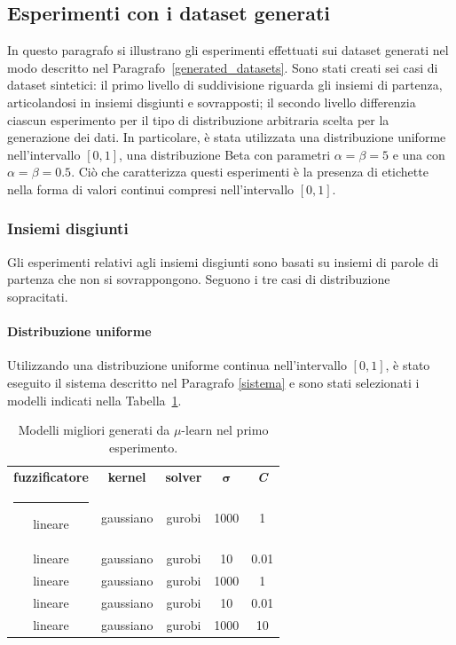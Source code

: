 \documentclass[12pt]{report}
\makeatletter
\theoremstyle{definition}
\newcommand{\thickhline}{%
    \noalign {\ifnum 0=`}\fi \hrule height 1pt
    \futurelet \reserved@a \@xhline
}
\makeatother
\begin{document}
\subsection{Esperimenti con i dataset generati}
In questo paragrafo si illustrano gli esperimenti effettuati sui dataset generati nel modo descritto nel Paragrafo~\ref{generated_datasets}. Sono stati creati sei casi di dataset sintetici: il primo livello di suddivisione riguarda gli insiemi di partenza, articolandosi in insiemi disgiunti e sovrapposti; il secondo livello differenzia ciascun esperimento per il tipo di distribuzione arbitraria scelta per la generazione dei dati. In particolare, è stata utilizzata una distribuzione uniforme nell'intervallo $[0,1]$, una distribuzione Beta con parametri $\alpha = \beta = 5$ e una con $\alpha = \beta = 0.5$. Ciò che caratterizza questi esperimenti è la presenza di etichette nella forma di valori continui compresi nell'intervallo $[0,1]$.

\subsubsection{Insiemi disgiunti}\label{insiemidisgiunti}
Gli esperimenti relativi agli insiemi disgiunti sono basati su insiemi di parole di partenza che non si sovrappongono. Seguono i tre casi di distribuzione sopracitati.

\paragraph{Distribuzione uniforme} Utilizzando una distribuzione uniforme continua nell'intervallo $[0,1]$, è stato eseguito il sistema descritto nel Paragrafo \ref{sistema} e sono stati selezionati i modelli indicati nella Tabella~\ref{models_exp1}.
\begin{table}
\centering
\begin{adjustbox}{max width=\textwidth}
 \begin{tabular}{|c|c|c|c|c|} 
 \hline
\textbf{fuzzificatore} & \textbf{kernel} & \textbf{solver} & $\bm{\sigma}$ & \textit{\textbf{C}}
\\ [0.5ex] 
 \thickhline
 lineare & gaussiano & gurobi & 1000 & 1 \\
 lineare & gaussiano & gurobi & 10 & 0.01 \\
 lineare & gaussiano & gurobi & 1000 & 1 \\
 lineare & gaussiano & gurobi & 10 & 0.01 \\
 lineare & gaussiano & gurobi & 1000 & 10 \\
 \hline
\end{tabular}
\end{adjustbox}
\caption{Modelli migliori generati da $\mu$-learn nel primo esperimento.}
\label{models_exp1}
\end{table}
\end{document}
